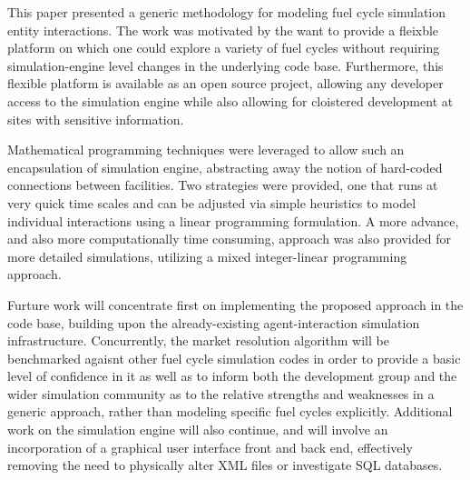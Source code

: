 This paper presented a generic methodology for modeling fuel cycle simulation
entity interactions. The work was motivated by the want to provide a fleixble
platform on which one could explore a variety of fuel cycles without requiring
simulation-engine level changes in the underlying code base. Furthermore, this
flexible platform is available as an open source project, allowing any developer
access to the simulation engine while also allowing for cloistered development
at sites with sensitive information. 

Mathematical programming techniques were leveraged to allow such an
encapsulation of simulation engine, abstracting away the notion of hard-coded
connections between facilities. Two strategies were provided, one that runs at
very quick time scales and can be adjusted via simple heuristics to model
individual interactions using a linear programming formulation. A more advance,
and also more computationally time consuming, approach was also provided for
more detailed simulations, utilizing a mixed integer-linear programming
approach.

Furture work will concentrate first on implementing the proposed approach in the
\Cyclus code base, building upon the already-existing agent-interaction
simulation infrastructure. Concurrently, the market resolution algorithm will be
benchmarked agaisnt other fuel cycle simulation codes in order to provide a
basic level of confidence in it as well as to inform both the \Cyclus
development group and the wider simulation community as to the relative
strengths and weaknesses in a generic approach, rather than modeling specific
fuel cycles explicitly. Additional work on the \Cyclus simulation engine will
also continue, and will involve an incorporation of a graphical user interface
front and back end, effectively removing the need to physically alter XML files
or investigate SQL databases.
